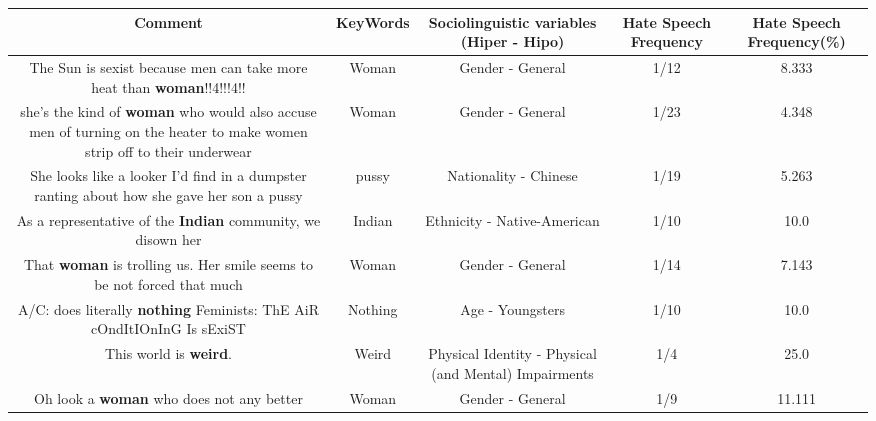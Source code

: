 \documentclass[11pt]{article}
\newlength\mylength
\begin{document}
\begin{center}
\setlength\mylength{\dimexpr\textwidth - 1\arrayrulewidth - 50\tabcolsep}
\begin{longtable}{|C{.65\mylength}|C{.30\mylength}|C{.12\mylength}|C{.12\mylength}|C{.12\mylength}|}
\hline
\textbf{Comment} & \textbf{KeyWords} & \textbf{Sociolinguistic variables (Hiper - Hipo)}  & \textbf{Hate Speech Frequency} & \textbf{Hate Speech Frequency(\%)} \\
\hline{}\small The Sun is sexist because men can take more heat than \textbf{woman}!!4!!!4!!\normalsize   & Woman & Gender - General & 1/12 & 8.333 \\  \hline
  \small she's the kind of \textbf{woman} who would also accuse men of turning on the heater to make women strip off to their underwear\normalsize   & Woman & Gender - General & 1/23 & 4.348 \\  \hline
  \small She looks like a looker I'd find in a dumpster ranting about how she gave her son a pussy\normalsize   & pussy & Nationality - Chinese & 1/19 & 5.263 \\  \hline
  \small As a representative of the \textbf{Indian} community, we disown her\normalsize   & Indian & Ethnicity - Native-American & 1/10 & 10.0 \\  \hline
  \small That \textbf{woman} is trolling us. Her smile seems to be not forced that much\normalsize   & Woman & Gender - General & 1/14 & 7.143 \\  \hline
  \small A/C: does literally \textbf{nothing} Feminists: ThE AiR cOndItIOnInG Is sExiST\normalsize   & Nothing & Age - Youngsters & 1/10 & 10.0 \\  \hline
  \small This world is \textbf{weird}.\normalsize   & Weird & Physical Identity - Physical (and Mental) Impairments & 1/4 & 25.0 \\  \hline
  \small Oh look a \textbf{woman} who does not any better\normalsize   & Woman & Gender - General & 1/9 & 11.111 \\  \hline

\end{longtable}
\end{center}
\end{document}
